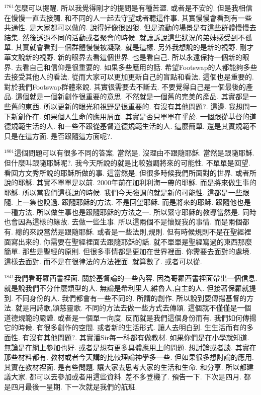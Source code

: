 \documentclass{book}
\begin{document}
$^{1761}$怎麼可以提醒.
所以我覺得剛才的提問是有種苦澀.
或者是不安的.
但是我相信在慢慢一直去接觸.
和不同的人一起去守望或者聽這件事.
其實慢慢會看到有一些共通性.
是大家都可以做的.
說得好像很凶狠.
但是流動的場景是有這些群體慢慢去結集.
然後透過不同的活動或者聚會的時候.
就讓訴說這些狀況的弟妹感受到不孤單.
其實就會看到一個群體慢慢被凝聚.
就是這樣.
另外我想說的是新的視野.
剛才華文說新的視野.
新的眼界去看這個世界.
也是看自己.
所以永遠保持一個新的眼界.
去看自己和信仰是很重要的.
如果多些應用的話.
希望Footswap的人都能夠多些去接受其他人的看法.
從而大家可以更加更新自己的盲點和看法.
這個也是重要的.
對於我們Footswap群體來說.
其實很需要去不斷去.
不要覺得自己是一個最後的產品.
這個就是一個新創作很重要的意思.
不然就是一個舊的完美的產品.
其實都是一些舊的東西.
所以更新的眼光和視野是很重要的.
有沒有其他問題?.
這邊.
我想問一下新創作在.
如果個人生命的應用層面.
其實是否只單單在乎於.
一個跟從基督的道德規範生活的人.
和一些不跟從基督道德規範生活的人.
這麼簡單.
還是其實規範不只是在這方面.
是否跟隨這方面呢?.

$^{1801}$這個問題可以有很多不同的答案.
當然是.
沒理由不跟隨耶穌.
當然是跟隨耶穌.
但什麼叫跟隨耶穌呢?.
我今天所說的就是比較強調將來的可能性.
不單單是回望.
看回方文秀所說的耶穌所做的事.
這當然是.
但很多時候我們所面對的世界.
或者所說的耶穌.
其實不單單是以前.
2000年前在加利利海一帶的耶穌.
而是將來做生事的耶穌.
所以當我們這樣說的時候.
我們今天強調的就是新的可能性.
這都是一些跟隨.
上一集也說過.
跟隨耶穌的方法.
不是回望耶穌.
而是將來的耶穌.
跟隨他也是一種方法.
所以做生事也是跟隨耶穌的方法之一.
所以緊守耶穌的教導當然是.
同時也會因為這樣的緣故.
去做一些生事.
所以這兩個不是懷疑我的事情.
而是兩個都有.
總的來說當然是跟隨耶穌.
或者是一些法則,規則.
但有時候規則不是在聖經裡面寫出來的.
你需要在聖經裡面去跟隨耶穌的話.
就不單單是聖經寫過的東西那麼簡單.
那些是聖經的原則.
但很多事情都是更加在世界裡面.
你需要去面對的處境.
這樣去面對.
而不是在很律法的方法裡面.
就算數了.
或者可以從.

$^{1841}$我們看哥羅西書裡面.
關於基督論的一些內容.
因為哥羅西書裡面帶出一個信息.
就是說我們不分什麼類型的人.
無論是希利里人,維魯人,自主的人.
但接著保羅就提到.
不同身份的人.
我們都會有一些不同的.
所謂的創作.
所以說到要傳揚基督的方法.
就是用詩歌,頌慈靈歌.
不同的方法去做一些方式去傳頌.
這個就不僅僅是一個道德規範的嚴謹.
或者是一個單一向度.
反而就是我們這個身份而有.
我們如何傳揚它的時候.
有很多創作的空間.
或者新的生活形式.
讓人去明白到.
生生活而有的多面性.
有沒有其他問題?.
其實潘Sir每一科都有做教材.
如果你們是在小學就知道.
無論是在網上參加也好.
或者是想有更多具體應用上的問題.
想討論或者談.
其實在那些材料都有.
教材或者今天講的比較理論神學多一些.
但如果很多想討論的應用.
其實在教材裡面.
是有些問題.
讓大家去思考大家的生活和生命.
和分享.
所以都建議大家.
都可以去參加或者用這些資料.
差不多登機了.
預告一下.
下次是四月.
都是四月最後一星期.
下一次就是我們的航班.
\end{document}

